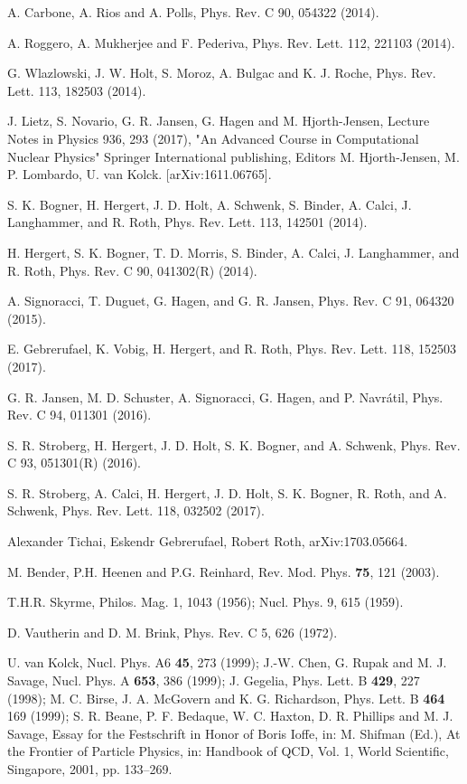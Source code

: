 \documentclass[aps,11pt,prc,preprint,superscriptaddress,nofootinbib]{revtex4}
\begin{document}
\begin{thebibliography}{99}
 A. Carbone, A. Rios and A. Polls, Phys. Rev. C 90, 054322
(2014).

 A. Roggero, A. Mukherjee and F. Pederiva, Phys. Rev. Lett. 112,
221103 (2014).

 G. Wlazlowski, J. W. Holt, S. Moroz, A. Bulgac and K. J.
Roche, Phys. Rev. Lett. 113, 182503 (2014).

 J. Lietz, S. Novario, G. R. Jansen, G. Hagen and M. Hjorth-Jensen, Lecture Notes in Physics 936, 293 (2017), "An Advanced Course in Computational Nuclear Physics" Springer International publishing, Editors M. Hjorth-Jensen, M. P. Lombardo, U. van Kolck.  [arXiv:1611.06765].

 S. K. Bogner, H. Hergert, J. D. Holt, A. Schwenk, S. Binder,
A. Calci, J. Langhammer, and R. Roth, Phys. Rev. Lett. 113, 142501 (2014).

 H. Hergert, S. K. Bogner, T. D. Morris, S. Binder, A. Calci,
J. Langhammer, and R. Roth, Phys. Rev. C 90, 041302(R) (2014).

 A. Signoracci, T. Duguet, G. Hagen, and G. R. Jansen, Phys.
Rev. C 91, 064320 (2015).

 E. Gebrerufael, K. Vobig, H. Hergert, and R. Roth, 
Phys. Rev. Lett. 118, 152503 (2017).


 G. R. Jansen, M. D. Schuster, A. Signoracci, G. Hagen, and
P. Navr\' atil, Phys. Rev. C 94, 011301 (2016).

 S. R. Stroberg, H. Hergert, J. D. Holt, S. K. Bogner, and
A. Schwenk, Phys. Rev. C 93, 051301(R) (2016).

 S. R. Stroberg, A. Calci, H. Hergert, J. D. Holt, S. K. Bogner,
R. Roth, and A. Schwenk, Phys. Rev. Lett. 118, 032502 (2017).

 Alexander Tichai, Eskendr Gebrerufael, Robert Roth,  arXiv:1703.05664. 

 M. Bender, P.H. Heenen and P.G. Reinhard, Rev. Mod. Phys. 
\textbf{75}, 121 (2003).

 T.H.R. Skyrme, Philos. Mag. 1, 1043 (1956); Nucl. Phys. 9,
615 (1959).

 D. Vautherin and D. M. Brink, Phys. Rev. C 5, 626 (1972).

 U. van Kolck, Nucl. Phys. A6 \textbf{45}, 273 (1999);
J.-W. Chen, G. Rupak and M. J. Savage, Nucl. Phys. A \textbf{653}, 386
(1999); J. Gegelia, Phys. Lett. B \textbf{429}, 227 (1998); M. C. Birse, J.
A. McGovern and K. G. Richardson, Phys. Lett. B \textbf{464} 169 (1999); S.
R. Beane, P. F. Bedaque, W. C. Haxton, D. R. Phillips and M. J. Savage,
Essay for the Festschrift in Honor of Boris Ioffe, in: M. Shifman (Ed.), At
the Frontier of Particle Physics, in: Handbook of QCD, Vol. 1, World
Scientific, Singapore, 2001, pp. 133--269.


\end{thebibliography}
\end{document}
